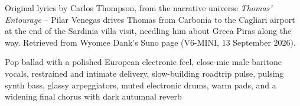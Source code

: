 
\begin{notes}
Original lyrics by Carlos Thompson, from the narrative universe \emph{Thomas' Entourage} -- Pilar Venegas drives Thomas from Carbonia to the Cagliari airport at the end of the Sardinia villa visit, needling him about Greca Piras along the way. Retrieved from Wyomee Dank's Suno page (V6-MINI, 13 September 2026).
\end{notes}
\begin{style}
Pop ballad with a polished European electronic feel, close-mic male baritone vocals, restrained and intimate delivery, slow-building roadtrip pulse, pulsing synth bass, glassy arpeggiators, muted electronic drums, warm pads, and a widening final chorus with dark autumnal reverb
\end{style}
